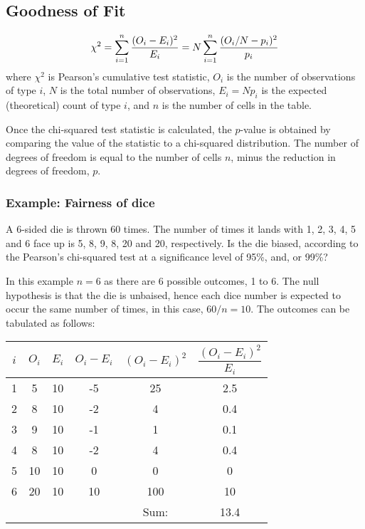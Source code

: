 \subsection{Goodness of Fit}

\begin{equation}
  \chi^2 = \sum^{n}_{i=1} \dfrac{(O_i - E_i)^2}{E_i} \\
    = N \sum^{n}_{i=1} \dfrac{(O_i / N - p_i)^2}{p_i}
\end{equation}
%
where $\chi^2$ is Pearson's cumulative test statistic, $O_i$ is the number of
observations of type $i$, $N$ is the total number of observations, $E_i = N
p_i$ is the expected (theoretical) count of type $i$, and $n$ is the number of
cells in the table.

Once the chi-squared test statistic is calculated, the $p$-value is obtained by
comparing the value of the statistic to a chi-squared distribution. The number
of degrees of freedom is equal to the number of cells $n$, minus the reduction
in degrees of freedom, $p$.

\subsubsection{Example: Fairness of dice}

A 6-sided die is thrown 60 times. The number of times it lands with 1, 2, 3, 4,
5 and 6 face up is 5, 8, 9, 8, 20 and 20, respectively. Is the die biased,
according to the Pearson's chi-squared test at a significance level of 95\%,
and, or 99\%?

In this example $n = 6$ as there are 6 possible outcomes, 1 to 6. The null
hypothesis is that the die is unbaised, hence each dice number is expected to
occur the same number of times, in this case, $60 / n = 10$. The outcomes can
be tabulated as follows:
%
\begin{table}[h]
  \center
  \begin{tabular}{cccccc}
    \toprule
    $i$
    & $O_i$
    & $E_i$
    & $O_i - E_i$
    & $(O_i - E_i)^2$
    & $\dfrac{(O_i - E_i)^2}{E_i}$ \\
    \hline
    1 & 5 & 10 & -5 & 25 & 2.5 \\
    2 & 8 & 10 & -2 & 4 & 0.4 \\
    3 & 9 & 10 & -1 & 1 & 0.1 \\
    4 & 8 & 10 & -2 & 4 & 0.4 \\
    5 & 10 & 10 & 0 & 0 &  0 \\
    6 & 20 & 10 & 10 & 100 & 10 \\
    \hline
    & & & & Sum: & 13.4 \\
    \bottomrule
  \end{tabular}
\end{table}

